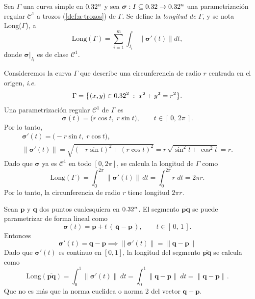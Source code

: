 \begin{definition}
    Sea $\Gamma$ una curva simple en $0.32^n$ y sea $\boldsymbol{\sigma}:I\subseteq0.32\to0.32^n$ una parametrizaci\'on regular $\mathcal{C}^1$ a trozos (\autoref{def:a-trozos}) de $\Gamma$. Se define la \emph{longitud de} $\Gamma$, y se nota  Long($\Gamma$), a 
    \[
        \text{Long}(\Gamma)=\sum_{i=1}^{m}\int_{I_i}\|\boldsymbol{\sigma}'(t)\|dt,    
    \]
    donde $\boldsymbol{\sigma}\lvert_{I_i}$ es de clase $\mathcal{C}^1$.
\end{definition}

\begin{example}
    Consideremos la curva $\Gamma$ que describe una circunferencia de radio $r$ centrada en el origen, \emph{i.e.}
        \[
            \Gamma = \bigl\{(x,y)\in0.32^2 \;:\; x^2 + y^2 = r^2 \bigr\}.
        \]
        Una parametrización regular \(\mathcal{C}^1\) de \(\Gamma\) es
        \[
            \boldsymbol{\sigma}(t) 
            = 
            \bigl(r\cos t,\;r\sin t\bigr),
            \qquad t\in [\,0,\,2\pi\,].
        \]
        Por lo tanto, 
        \begin{gather*}
            \boldsymbol{\sigma}'(t)
            =
            \bigl(-r\sin t,\;r\cos t\bigr),\\[.2cm]
            \|\boldsymbol{\sigma}'(t)\|
            =
            \sqrt{(-r\sin t)^2 + (r\cos t)^2}
            =
            r\,\sqrt{\sin^2 t + \cos^2 t}
            = 
            r.
        \end{gather*}
        Dado que \(\boldsymbol{\sigma}\) ya es \(\mathcal{C}^1\) en todo \([0,2\pi]\), se calcula la longitud de $\Gamma$ como
        \[
            \mathrm{Long}(\Gamma)
            =
            \int_{0}^{2\pi} \bigl\|\boldsymbol{\sigma}'(t)\bigr\| \, dt
            =
            \int_{0}^{2\pi} r \; dt
            =
            2\pi r.
        \]
        Por lo tanto, la circunferencia de radio \(r\) tiene longitud \(2\pi r\).
    \end{example}

    \begin{example}
    Sean $\mathbf{p}$ y $\mathbf{q}$ dos puntos cualesquiera en \(0.32^n\). El segmento \(\overline{\mathbf{pq}}\) se puede parametrizar de forma lineal como
        \[
            \boldsymbol{\sigma}(t) 
            = 
            \mathbf{p} + t\, (\,\mathbf{q} - \mathbf{p}\,),
            \qquad t\in [\,0,\,1\,].
        \]
        Entonces 
        \[
            \boldsymbol{\sigma}'(t) = \mathbf{q} - \mathbf{p}
            \implies \|\boldsymbol{\sigma}'(t)\| = \|\mathbf{q} - \mathbf{p}\|
        \]
        Dado que \(\boldsymbol{\sigma}'(t)\) es continuo en \([0,1]\), la longitud del segmento \(\overline{\mathbf{pq}}\) se calcula como
        \[
            \mathrm{Long}(\overline{\mathbf{pq}})
            =
            \int_{0}^{1} \|\boldsymbol{\sigma}'(t)\|\: dt
            =
            \int_{0}^{1} \|\mathbf{q} - \mathbf{p}\|\: dt
            =
            \|\mathbf{q} - \mathbf{p}\|.
        \]
        Que no es m\'as que la norma euclidea o norma 2 del vector $\mathbf{q} - \mathbf{p}$.
\end{example}


